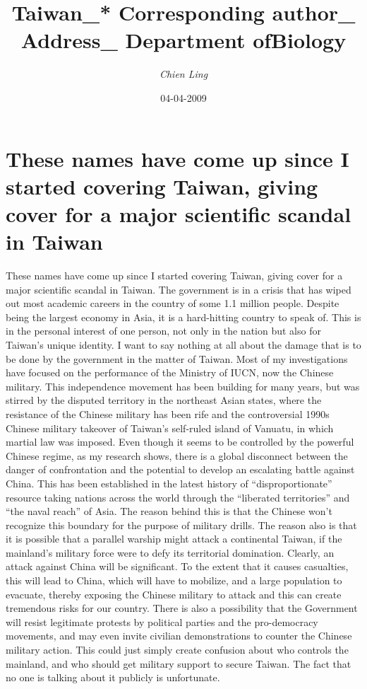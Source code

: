\documentclass{article}%
\title{Taiwan\_* Corresponding author\_ Address\_ Department ofBiology}%
\author{\textit{Chien Ling}}%
\date{04-04-2009}%
\begin{document}
%
\normalsize%
\maketitle%
\section{These names have come up since I started covering Taiwan, giving cover for a major scientific scandal in Taiwan}%
\label{sec:ThesenameshavecomeupsinceIstartedcoveringTaiwan,givingcoverforamajorscientificscandalinTaiwan}%
These names have come up since I started covering Taiwan, giving cover for a major scientific scandal in Taiwan. The government is in a crisis that has wiped out most academic careers in the country of some 1.1 million people. Despite being the largest economy in Asia, it is a hard{-}hitting country to speak of. This is in the personal interest of one person, not only in the nation but also for Taiwan’s unique identity. I want to say nothing at all about the damage that is to be done by the government in the matter of Taiwan. Most of my investigations have focused on the performance of the Ministry of IUCN, now the Chinese military. This independence movement has been building for many years, but was stirred by the disputed territory in the northeast Asian states, where the resistance of the Chinese military has been rife and the controversial 1990s Chinese military takeover of Taiwan’s self{-}ruled island of Vanuatu, in which martial law was imposed.\newline%
Even though it seems to be controlled by the powerful Chinese regime, as my research shows, there is a global disconnect between the danger of confrontation and the potential to develop an escalating battle against China. This has been established in the latest history of “disproportionate” resource taking nations across the world through the “liberated territories” and “the naval reach” of Asia. The reason behind this is that the Chinese won’t recognize this boundary for the purpose of military drills. The reason also is that it is possible that a parallel warship might attack a continental Taiwan, if the mainland’s military force were to defy its territorial domination.\newline%
Clearly, an attack against China will be significant. To the extent that it causes casualties, this will lead to China, which will have to mobilize, and a large population to evacuate, thereby exposing the Chinese military to attack and this can create tremendous risks for our country. There is also a possibility that the Government will resist legitimate protests by political parties and the pro{-}democracy movements, and may even invite civilian demonstrations to counter the Chinese military action. This could just simply create confusion about who controls the mainland, and who should get military support to secure Taiwan. The fact that no one is talking about it publicly is unfortunate.\newline%
\end{document}
